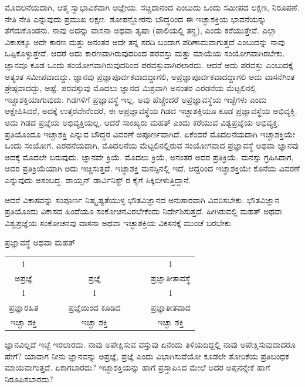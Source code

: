 ಮೊದಲನೆಯದಾಗಿ, ಆತ್ಮ ಸ್ವಾಭಾವಿಕವಾಗಿ ಅಜ್ಞೇಯ. ಸಚ್ಚಿದಾನಂದ ಎಂಬುದು ಒಂದು ಸಮೀಪದ ಲಕ್ಷಣ, ನಿರೂಪಣೆ. ನೇತಿ ನೇತಿ ಎನ್ನುವುದು ಪ್ರಮುಖ ಲಕ್ಷಣ. ಶೋಪನ್ಹೋರನು ಬೌದ್ಧರಿಂದ ಈ ಇಚ್ಛಾಶಕ್ತಿಯ ಭಾವನೆಯನ್ನು ತೆಗೆದುಕೊಂಡನು. ನಾವು ಅದನ್ನು ವಾಸನಾ ಅಥವಾ ತೃಷಾ (ಪಾಲಿಯಲ್ಲಿ ತನ್ಹ), ಎಂದು ಕರೆಯುತ್ತೇವೆ. ಎಲ್ಲಾ ವಿಕಾಸಕ್ಕೂ ಅದೇ ಕಾರಣ ಮತ್ತು ಅನಂತರ ಅದೇ ತನ್ನ ಸರದಿ ಬಂದಾಗ ಪರಿಣಾಮವಾಗುತ್ತದೆ ಎಂಬುದನ್ನು ನಾವು ಒಪ್ಪಿಕೊಳ್ಳುತ್ತೇವೆ. ಆದರೆ ಅದು ಕಾರಣವಾಗಿರುವುದರಿಂದ ಪರವಸ್ತು ಮತ್ತು ಮಾಯೆಯ ಸಂಯೋಗವಾಗಿರಬೇಕು. ಜ್ಞಾನವೂ ಕೂಡ ಒಂದು ಸಂಯೋಗವಾಗಿರುವುದರಿಂದ ಪರವಸ್ತುವಾಗಿರಲಾರದು. ಆದರೆ ಅದು ಪರವಸ್ತು ಎಂಬುದಕ್ಕೆ ಅತ್ಯಂತ ಸಮೀಪವಾದದ್ದು. ಜ್ಞಾನವು ಪ್ರಜ್ಞಾಪೂರ್ವಕವಾದದ್ದಾಗಲಿ, ಅಪ್ರಜ್ಞಾಪೂರ್ವಕವಾದದ್ದಾಗಲಿ ಅದು ವಾಸನೆಗಿಂತ ಶ್ರೇಷ್ಠವಾದದ್ದು, ಅಷ್ಟೆ. ಪರವಸ್ತುವು ಮೊದಲು ಜ್ಞಾನದ ಮಿಶ್ರವಾಗಿ ಅನಂತರ ಎರಡನೆಯ ಮೆಟ್ಟಲಿನಲ್ಲಿ ಇಚ್ಛಾಶಕ್ತಿಯಾಗುವುದು. ಗಿಡಗಳಿಗೆ ಪ್ರಜ್ಞಾವಸ್ಥೆ ಇಲ್ಲ. ಅವು ಹೆಚ್ಚೆಂದರೆ ಅಪ್ರಜ್ಞಾವಸ್ಥೆಯ ಇಚ್ಛೆಗಳು ಎಂದು ಆಕ್ಷೇಪಿಸಿದರೆ, ಅದಕ್ಕೆ ಉತ್ತರವೇನೆಂದರೆ, ಈ ಅಪ್ರಜ್ಞಾವಸ್ಥೆಯ ಗಿಡದ ಇಚ್ಛಾಶಕ್ತಿಯೂ ಕೂಡ ಪ್ರಜ್ಞಾವಸ್ಥೆಯ ಅಭಿವ್ಯಕ್ತಿ. ಅದು ಗಿಡದ ಪ್ರಜ್ಞೆಯ ಅಭಿವ್ಯಕ್ತಿಯಲ್ಲ. ಆದರೆ ಸಾಂಖ್ಯರು ಮಹತ್ ಎಂದು ಕರೆಯುವ ವಿಶ್ವಪ್ರಜ್ಞೆಯ ಅಭಿವ್ಯಕ್ತಿ. ಪ್ರತಿಯೊಂದೂ ಇಚ್ಛಾಶಕ್ತಿ ಎನ್ನುವ ಬೌದ್ಧರ ವಿವರಣೆ ಅಪೂರ್ಣವಾಗಿದೆ. ಏಕೆಂದರೆ ಮೊದಲನೆಯದಾಗಿ ಇಚ್ಛಾಶಕ್ತಿಯೇ ಒಂದು ಸಂಯೋಗ. ಎರಡನೆಯದಾಗಿ, ಮೊದಲನೆಯ ಮೆಟ್ಟಲಿನಲ್ಲಿರುವ ಸಂಯೋಗವಾದ ಪ್ರಜ್ಞಾವಸ್ಥೆ ಅಥವಾ ಜ್ಞಾನವು ಅದಕ್ಕೆ ಮೊದಲೇ ಬರುವುದು. ಜ್ಞಾನವೇ ಕ್ರಿಯೆ. ಮೊದಲು ಕ್ರಿಯೆ, ಅನಂತರ ಅದರ ಪ್ರತಿಕ್ರಿಯೆ. ಮನಸ್ಸು ಗ್ರಹಿಸಿದಾಗ, ಅದರ ಪ್ರತಿಕ್ರಿಯೆಯಾಗಿ ಅದು ಇಚ್ಚಿಸುತ್ತದೆ. ಇಚ್ಛಾಶಕ್ತಿ ಮನಸ್ಸಿನಲ್ಲಿ ಇದೆ. ಆದ್ದರಿಂದ ಇಚ್ಛಾಶಕ್ತಿಯೇ ಕೊನೆಯ ವಿವರಣೆ ಎನ್ನುವುದು ಅಸಂಬದ್ಧ. ಡಾಯ್ಸನ್ ಡಾರ್ವಿನಿಸ್ಟ್ ರ ಕೈಗೆ ಸಿಕ್ಕಿಬೀಳುತ್ತಿದ್ದಾನೆ.
\vspace{0.1cm}

ಆದರೆ ವಿಕಾಸವನ್ನು ಸಂಪೂರ್ಣ ನಿಷ್ಕೃಷ್ಟತೆಯುಳ್ಳ ಭೌತವಿಜ್ಞಾನದ ಅನುಸಾರವಾಗಿ ವಿವರಿಸಬೇಕು. ಭೌತವಿಜ್ಞಾನ ಪ್ರತಿಯೊಂದು ವಿಕಾಸದ ಹಿಂದೆಯೂ ಸಂಕೋಚನವಿರಬೇಕೆಂದು ನಿರ್ದೇಶಿಸುತ್ತದೆ. ಹೀಗಿರುವಲ್ಲಿ ಮಹತ್ ಅಥವಾ ವಿಶ್ವಪ್ರಜ್ಞೆಯ ಸಂಕೋಚನವು ವಾಸನಾ ಅಥವಾ ಇಚ್ಛಾಶಕ್ತಿಯ ವಿಕಸನಕ್ಕೆ ಮುಂಚೆ ಬರಬೇಕು.
\begin{center}
ಪ್ರಜ್ಞಾವಸ್ಥೆ ಅಥವಾ ಮಹತ್ 

\begin{tabular}{c@{$\;$}c@{$\;$}c}
1  & & 1\\
ಅಪ್ರಜ್ಞೆ & ಪ್ರಜ್ಞೆ & ಪ್ರಜ್ಞಾತೀತಾವಸ್ಥೆ \\
1 & 1 & 1 \\
ಪ್ರಜ್ಞಾರಹಿತ  & ~~ ~~ ಪ್ರಜ್ಞೆಯಿಂದ ಕೂಡಿದ ~~ ~~& ಪ್ರಜ್ಞಾತೀತವಾದ \\
ಇಚ್ಛಾ ಶಕ್ತಿ &  ಇಚ್ಛಾ ಶಕ್ತಿ &  ಇಚ್ಛಾ ಶಕ್ತಿ 
\end{tabular}
\end{center}

ಜ್ಞಾನವಿಲ್ಲದೆ ಇಚ್ಛೆ ಇರಲಾರದು. ನಾವು ಅಪೇಕ್ಷಿಸುವ ವಸ್ತುವು ಏನೆಂದು ತಿಳಿಯದಿದ್ದಲ್ಲಿ ನಾವು ಅಪೇಕ್ಷಿಸುವುದಾದರೂ ಹೇಗೆ? ಯಾವಾಗ ನೀನು ಜ್ಞಾನವನ್ನು ಅಪ್ರಜ್ಞೆ, ಪ್ರಜ್ಞೆ ಎಂದು ವಿಭಾಗಿಸುವೆಯೋ ಕೂಡಲೇ ತೋರಿಕೆಯ ಪ್ರತಿಬಂಧಕ ಮಾಯವಾಗುತ್ತದೆ. ಏಕಾಗಬಾರದು? ಇಚ್ಛಾಶಕ್ತಿಯನ್ನು ಹಾಗೆ ಪ್ರಸ್ತಾಪಿಸಿದ ಮೇಲೆ ಅದರ ಅಪ್ಪನನ್ನೇಕೆ ಹಾಗೆ ನಿರೂಪಿಸಬಾರದು?

